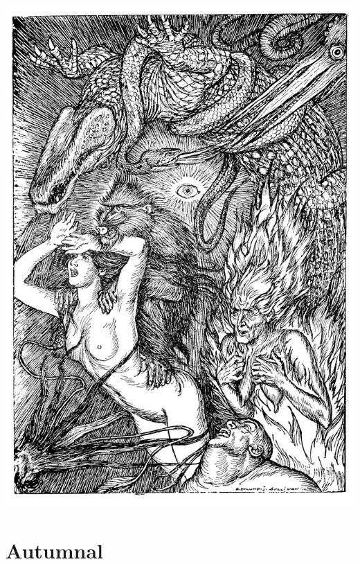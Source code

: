 \documentclass{amsbook}
\begin{document}
\thispagestyle{empty}
\vspace*{\fill}
{\centering
\includegraphics[width=\textwidth]{images/placeholder_image.jpg}}
\vspace*{\fill}
\clearpage

\mainmatter

\chapter{Autumnal}
\end{document}
